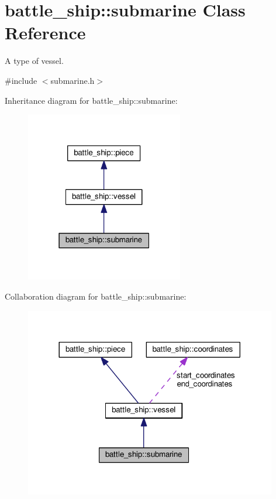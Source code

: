 \hypertarget{classbattle__ship_1_1submarine}{}\section{battle\+\_\+ship\+:\+:submarine Class Reference}
\label{classbattle__ship_1_1submarine}


A type of vessel.  




{\ttfamily \#include $<$submarine.\+h$>$}



Inheritance diagram for battle\+\_\+ship\+:\+:submarine\+:
\nopagebreak
\begin{figure}[H]
\begin{center}
\leavevmode
\includegraphics[width=195pt]{classbattle__ship_1_1submarine__inherit__graph}
\end{center}
\end{figure}


Collaboration diagram for battle\+\_\+ship\+:\+:submarine\+:
\nopagebreak
\begin{figure}[H]
\begin{center}
\leavevmode
\includegraphics[width=312pt]{classbattle__ship_1_1submarine__coll__graph}
\end{center}
\end{figure}
